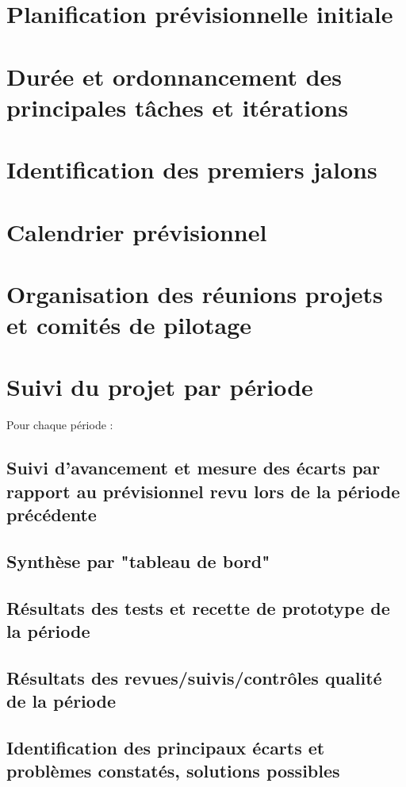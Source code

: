 \documentclass[11pt,a4paper,titlepage,openright]{report}
\begin{document}
    \section{Planification prévisionnelle initiale}
    \section{Durée et ordonnancement des principales tâches et itérations}
    \section{Identification des premiers jalons}
    \section{Calendrier prévisionnel}
    \section{Organisation des réunions projets et comités de pilotage}
    \section{Suivi du projet par période}
    Pour chaque période :
    \subsection{Suivi d’avancement et mesure des écarts par rapport au prévisionnel revu lors de la période précédente}

    \subsection{Synthèse par "tableau de bord"}

    \subsection{Résultats des tests et recette de prototype de la période}

    \subsection{Résultats des revues/suivis/contrôles qualité de la période}

    \subsection{Identification des principaux écarts et problèmes constatés, solutions possibles}
\end{document}
